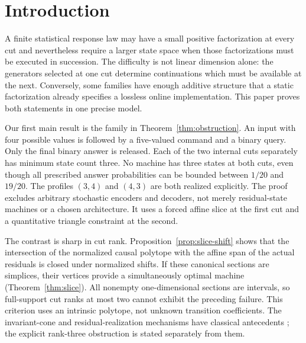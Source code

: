\section{Introduction}
A finite statistical response law may have a small positive factorization
at every cut and nevertheless require a larger state space when those
factorizations must be executed in succession. The difficulty is not
linear dimension alone: the generators selected at one cut determine
continuations which must be available at the next. Conversely, some
families have enough additive structure that a static factorization
already specifies a lossless online implementation. This paper proves
both statements in one precise model.

Our first main result is the family in Theorem~\ref{thm:obstruction}.
An input with four possible values is followed by a five-valued command
and a binary query. Only the final binary answer is released. Each of
the two internal cuts separately has minimum state count three. No machine
has three states at both cuts, even though all prescribed answer
probabilities can be bounded between $1/20$ and $19/20$. The profiles
$(3,4)$ and $(4,3)$ are both realized explicitly. The proof excludes
arbitrary stochastic encoders and decoders, not merely residual-state
machines or a chosen architecture. It uses a forced affine slice at the
first cut and a quantitative triangle constraint at the second.

The contrast is sharp in cut rank. Proposition~\ref{prop:slice-shift}
shows that the intersection of the normalized causal polytope with the
affine span of the actual residuals is closed under normalized shifts.
If these canonical sections are simplices, their vertices provide a
simultaneously optimal machine (Theorem~\ref{thm:slice}). All nonempty
one-dimensional sections are intervals, so full-support cut ranks at most
two cannot exhibit the preceding failure. This criterion uses an intrinsic
polytope, not unknown transition coefficients. The invariant-cone and
residual-realization mechanisms have classical antecedents
\cite{Heller,Vidyasagar,DenisEsposito}; the explicit rank-three obstruction
is stated separately from them.


